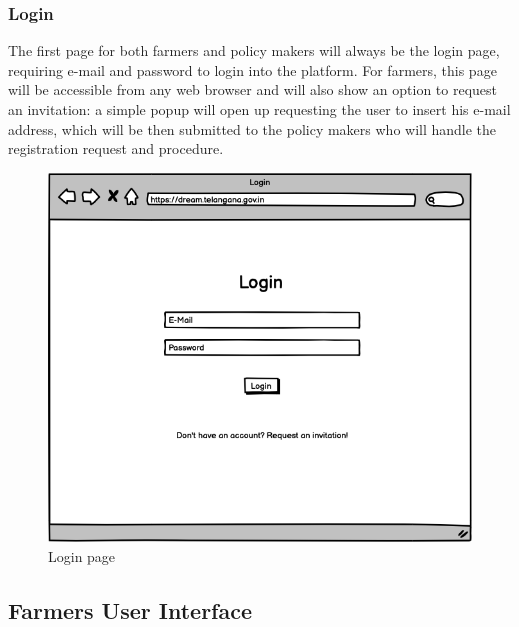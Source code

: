 \documentclass[10pt]{article} %
\begin{document}
\subsubsection{Login}
The first page for both farmers and policy makers will always be the login page, requiring e-mail and password to login into the platform.
For farmers, this page will be accessible from any web browser and will also show an option to request an invitation: a simple popup will open up requesting
the user to insert his e-mail address, which will be then submitted to the policy makers who will handle the registration request and procedure.
\begin{figure}[h!]
    \centering
    \centerline{\includegraphics[scale=0.5]{images/uimockups/login.png}}
    \caption{Login page}
    \label{fig:ui_login}
\end{figure}

\newpage
\subsection{Farmers User Interface}
\end{document}
